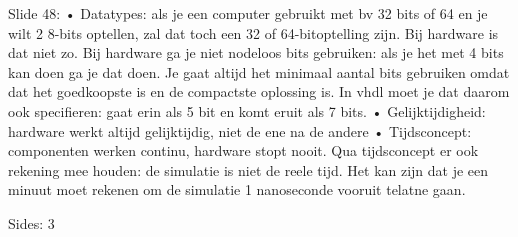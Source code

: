 \documentclass[10pt,a4paper]{book}
\begin{document}
Slide 48: 
	• Datatypes: als je een computer gebruikt met bv 32 bits of 64 en je wilt 2 8-bits optellen, zal dat toch een 32 of 64-bitoptelling zijn. Bij hardware is dat niet zo. Bij hardware ga je niet nodeloos bits gebruiken: als je het met 4 bits kan doen ga je dat doen. Je gaat altijd het minimaal aantal bits gebruiken omdat dat het goedkoopste is en de compactste oplossing is. In vhdl moet je dat daarom ook specifieren: gaat erin als 5 bit en komt eruit als 7 bits.
	• Gelijktijdigheid: hardware werkt altijd gelijktijdig, niet de ene na de andere
	• Tijdsconcept: componenten werken continu, hardware stopt nooit. Qua tijdsconcept er ook rekening mee houden: de simulatie is niet de reele tijd. Het kan zijn dat je een minuut moet rekenen om de simulatie 1 nanoseconde vooruit telatne gaan.
	
Sides: 3
\end{document}
